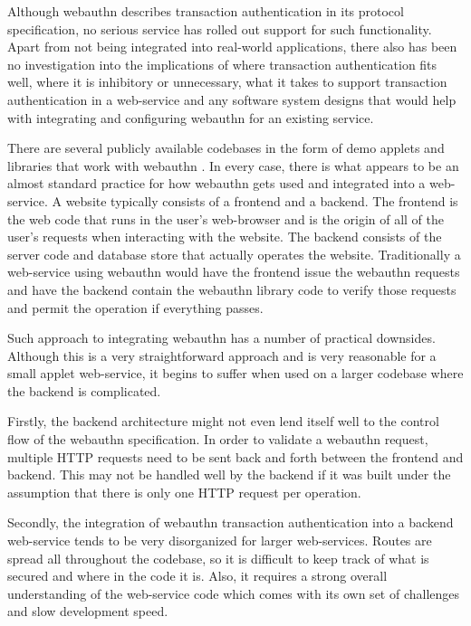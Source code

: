 Although webauthn describes transaction authentication in its protocol specification, no serious service has rolled out support for such functionality. Apart from not being integrated into real-world applications, there also has been no investigation into the implications of where transaction authentication fits well, where it is inhibitory or unnecessary, what it takes to support transaction authentication in a web-service and any software system designs that would help with integrating and configuring webauthn for an existing service.

There are several publicly available codebases in the form of demo applets and libraries that work with webauthn \cite{TODO-webauthn-codebases-from-webauthn-website}. In every case, there is what appears to be an almost standard practice for how webauthn gets used and integrated into a web-service. A website typically consists of a frontend and a backend. The frontend is the web code that runs in the user's web-browser and is the origin of all of the user's requests when interacting with the website. The backend consists of the server code and database store that actually operates the website. Traditionally a web-service using webauthn would have the frontend issue the webauthn requests and have the backend contain the webauthn library code to verify those requests and permit the operation if everything passes.

Such approach to integrating webauthn has a number of practical downsides. Although this is a very straightforward approach and is very reasonable for a small applet web-service, it begins to suffer when used on a larger codebase where the backend is complicated. 

Firstly, the backend architecture might not even lend itself well to the control flow of the webauthn specification. In order to validate a webauthn request, multiple HTTP requests need to be sent back and forth between the frontend and backend. This may not be handled well by the backend if it was built under the assumption that there is only one HTTP request per operation.

Secondly, the integration of webauthn transaction authentication into a backend web-service tends to be very disorganized for larger web-services. Routes are spread all throughout the codebase, so it is difficult to keep track of what is secured and where in the code it is. Also, it requires a strong overall understanding of the web-service code which comes with its own set of challenges and slow development speed.

